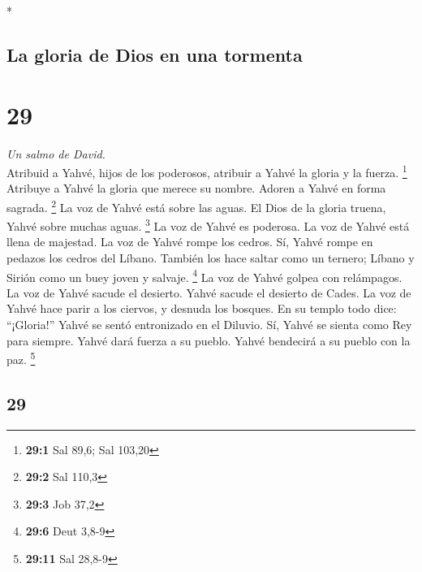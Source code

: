 \begin{paracol}{2}
\begin{otherlanguage}{english}
\end{otherlanguage}

\switchcolumn[0]*

\hypertarget{la-gloria-de-dios-en-una-tormenta}{%
\subsection{La gloria de Dios en una
tormenta}\label{la-gloria-de-dios-en-una-tormenta}}

\hypertarget{section-56}{%
\section{29}\label{section-56}}

\emph{Un salmo de David.}\\
 Atribuid a Yahvé, hijos de los poderosos, atribuir a
Yahvé la gloria y la fuerza. \footnote{\textbf{29:1} Sal 89,6; Sal
  103,20}  Atribuye a Yahvé la gloria que merece su
nombre. Adoren a Yahvé en forma sagrada. \footnote{\textbf{29:2} Sal
  110,3}  La voz de Yahvé está sobre las aguas. El Dios de
la gloria truena, Yahvé sobre muchas aguas. \footnote{\textbf{29:3} Job
  37,2}  La voz de Yahvé es poderosa. La voz de Yahvé está
llena de majestad.  La voz de Yahvé rompe los cedros. Sí,
Yahvé rompe en pedazos los cedros del Líbano.  También los
hace saltar como un ternero; Líbano y Sirión como un buey joven y
salvaje. \footnote{\textbf{29:6} Deut 3,8-9}  La voz de
Yahvé golpea con relámpagos.  La voz de Yahvé sacude el
desierto. Yahvé sacude el desierto de Cades.  La voz de
Yahvé hace parir a los ciervos, y desnuda los bosques. En su templo todo
dice: ``¡Gloria!''  Yahvé se sentó entronizado en el
Diluvio. Sí, Yahvé se sienta como Rey para siempre. 
Yahvé dará fuerza a su pueblo. Yahvé bendecirá a su pueblo con la paz.
\footnote{\textbf{29:11} Sal 28,8-9}

\switchcolumn
\begin{otherlanguage}{english}

\hypertarget{section-57}{%
\section{29}\label{section-57}}


\end{otherlanguage}
\end{paracol}
